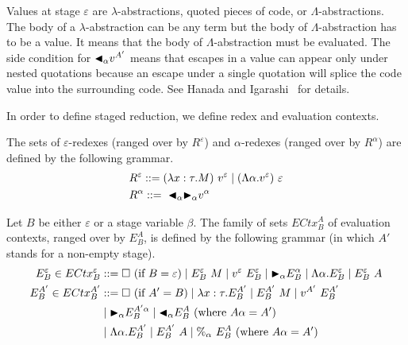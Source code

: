 Values at stage $\varepsilon$ are $\lambda$-abstractions, quoted pieces of
code, or $\Lambda$-abstractions. The body of a $\lambda$-abstraction can be any
term but the body of $\Lambda$-abstraction has to be a value.  It means that
the body of $\Lambda$-abstraction must be evaluated.  The side condition for
${\mathop{\blacktriangleleft}}_\alpha v^{A'}$ means that escapes in a value can appear only under nested
quotations because an escape under a single quotation will splice the code
value into the surrounding code. See Hanada and Igarashi~\cite{Hanada2014} for
details.

In order to define staged reduction, we define redex and evaluation contexts.

\begin{definition}[Redex]
  The sets of $\varepsilon$-redexes (ranged over by $R^\varepsilon$) and $\alpha$-redexes (ranged over by $R^\alpha$) are defined by the following grammar.
  \begin{align*}
     & R^\varepsilon ::= (\lambda x:\tau.M)\ v^\varepsilon \mid (\Lambda\alpha.v^\varepsilon)\ \varepsilon \\
     & R^\alpha      ::=\ {\mathop{\blacktriangleleft}}_\alpha {\mathop{\blacktriangleright}}_\alpha v^\alpha                                                         \\
  \end{align*}
\end{definition}

\begin{definition}
  Let $B$ be either \(\varepsilon\) or a stage variable \(\beta\).
  The family of sets $ECtx^A_B$ of evaluation contexts, ranged over by $E^A_B$, is defined by the following grammar (in which $A'$ stands for a non-empty stage).
  \begin{align*}
    E^\varepsilon_B \in ECtx^\varepsilon_B & ::= \square\ (\text{if\ } B = \varepsilon)
    \mid E^\varepsilon_B\ M \mid v^\varepsilon\ E^\varepsilon_B \mid {\mathop{\blacktriangleright}}_\alpha E^\alpha_B
    \mid \Lambda\alpha.E^\varepsilon_B \mid E^\varepsilon_B\ A                                                                                    \\
    E^{A'}_B \in ECtx^{A'}_B               & ::= \square\ (\text{if } A' = B) \mid \lambda x:\tau.E^{A'}_B \mid E^{A'}_B\ M \mid v^{A'}\ E^{A'}_B \\
                                           & \mid {\mathop{\blacktriangleright}}_\alpha E^{A'\alpha}_B \mid {\mathop{\blacktriangleleft}}_\alpha E^{A}_B \ (\text{where } A\alpha = A')               \\
                                           & \mid \Lambda\alpha.E^{A'}_B \mid E^{A'}_B\ A \mid \%_\alpha\ E^{A}_B \ (\text{where } A\alpha = A')
  \end{align*}
\end{definition}


